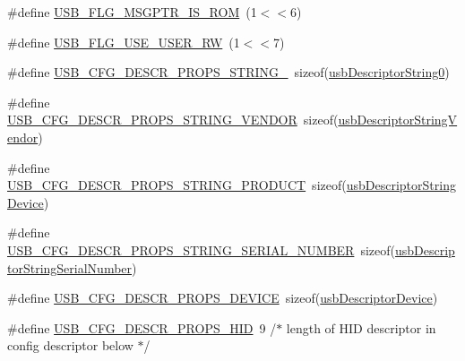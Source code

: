 \begin{DoxyCompactItemize}
\item 
\#define \hyperlink{mhvlib-_vusb-_console_2vusb_2usbdrv_8c_a06db19dbad17d54fc6f3742ab0afba69}{U\-S\-B\-\_\-\-F\-L\-G\-\_\-\-M\-S\-G\-P\-T\-R\-\_\-\-I\-S\-\_\-\-R\-O\-M}~(1$<$$<$6)
\item 
\#define \hyperlink{mhvlib-_vusb-_console_2vusb_2usbdrv_8c_ad2fe7ee90d3349e1399f61eda81d48e9}{U\-S\-B\-\_\-\-F\-L\-G\-\_\-\-U\-S\-E\-\_\-\-U\-S\-E\-R\-\_\-\-R\-W}~(1$<$$<$7)
\item 
\#define \hyperlink{mhvlib-_vusb-_console_2vusb_2usbdrv_8c_a9c0556a4c6c5a1ab8f6598aee8e5bf6a}{U\-S\-B\-\_\-\-C\-F\-G\-\_\-\-D\-E\-S\-C\-R\-\_\-\-P\-R\-O\-P\-S\-\_\-\-S\-T\-R\-I\-N\-G\-\_}~sizeof(\hyperlink{mhvlib-_vusb-_console_2vusb_2usbdrv_8h_a367afe22c903b4b58805cc451c22cb99}{usb\-Descriptor\-String0})
\item 
\#define \hyperlink{mhvlib-_vusb-_console_2vusb_2usbdrv_8c_a55edf2117128387162339d98ba2af0f4}{U\-S\-B\-\_\-\-C\-F\-G\-\_\-\-D\-E\-S\-C\-R\-\_\-\-P\-R\-O\-P\-S\-\_\-\-S\-T\-R\-I\-N\-G\-\_\-\-V\-E\-N\-D\-O\-R}~sizeof(\hyperlink{mhvlib-_vusb-_console_2vusb_2usbdrv_8h_aa92b0dfd57d302ff023bfb7ed868c2a1}{usb\-Descriptor\-String\-Vendor})
\item 
\#define \hyperlink{mhvlib-_vusb-_console_2vusb_2usbdrv_8c_aa08084f9755a643e02d469b66b129ef6}{U\-S\-B\-\_\-\-C\-F\-G\-\_\-\-D\-E\-S\-C\-R\-\_\-\-P\-R\-O\-P\-S\-\_\-\-S\-T\-R\-I\-N\-G\-\_\-\-P\-R\-O\-D\-U\-C\-T}~sizeof(\hyperlink{mhvlib-_vusb-_console_2vusb_2usbdrv_8h_a1f252008bbf46a3172ebf8a4f8213a60}{usb\-Descriptor\-String\-Device})
\item 
\#define \hyperlink{mhvlib-_vusb-_console_2vusb_2usbdrv_8c_a82224c07d3a1f9fcccbff70b71c8ea51}{U\-S\-B\-\_\-\-C\-F\-G\-\_\-\-D\-E\-S\-C\-R\-\_\-\-P\-R\-O\-P\-S\-\_\-\-S\-T\-R\-I\-N\-G\-\_\-\-S\-E\-R\-I\-A\-L\-\_\-\-N\-U\-M\-B\-E\-R}~sizeof(\hyperlink{mhvlib-_vusb-_console_2vusb_2usbdrv_8h_a97aa1ed300e711b6eabb5cef561313a3}{usb\-Descriptor\-String\-Serial\-Number})
\item 
\#define \hyperlink{mhvlib-_vusb-_console_2vusb_2usbdrv_8c_aa916bf33f6f8f481a219d0a81b5b225e}{U\-S\-B\-\_\-\-C\-F\-G\-\_\-\-D\-E\-S\-C\-R\-\_\-\-P\-R\-O\-P\-S\-\_\-\-D\-E\-V\-I\-C\-E}~sizeof(\hyperlink{mhvlib-_vusb-_console_2vusb_2usbdrv_8h_a1b8593e30029ecfd59a89335a12db631}{usb\-Descriptor\-Device})
\item 
\#define \hyperlink{mhvlib-_vusb-_console_2vusb_2usbdrv_8c_adfbd53b5310c36b1e4b06d6a3b992e8a}{U\-S\-B\-\_\-\-C\-F\-G\-\_\-\-D\-E\-S\-C\-R\-\_\-\-P\-R\-O\-P\-S\-\_\-\-H\-I\-D}~9   /$\ast$ length of H\-I\-D descriptor in config descriptor below $\ast$/

\end{DoxyCompactItemize}
